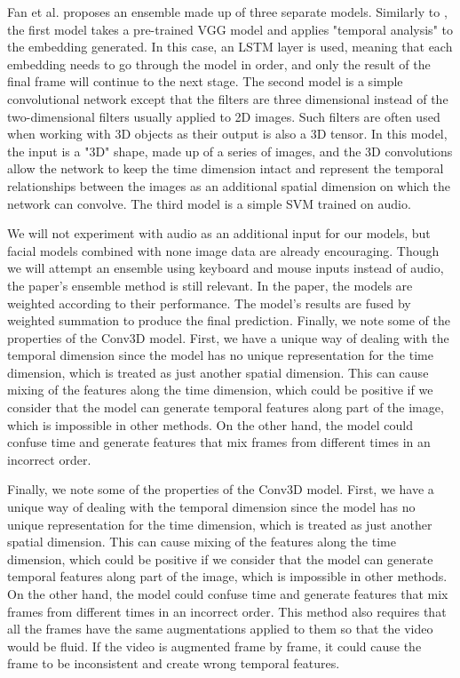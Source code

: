 \documentclass[../main.tex]{subfiles}
\begin{document}
Fan et al. \cite{c3d} proposes an ensemble made up of three separate models. Similarly to \cite{fan},
the first model takes a pre-trained VGG model and applies "temporal analysis" to the embedding generated. In this case,
an LSTM \cite{lstm} layer is used, meaning that each embedding needs to go through the model in order, and only the result of the final frame will
continue to the next stage. The second model is a simple convolutional network except that the filters are three dimensional instead of
the two-dimensional filters usually applied to 2D images. Such filters are often used when working with 3D objects as their output is also a 3D tensor.
In this model, the input is a "3D" shape, made up of a series of images, and the 3D convolutions allow the network to keep the time dimension intact
and represent the temporal relationships between the images as an additional spatial dimension on which the network can convolve. The third model
is a simple SVM trained on audio.
\par

We will not experiment with audio as an additional input for our models, but facial models combined with none image data are already encouraging.
Though we will attempt an ensemble using keyboard and mouse inputs instead of audio, the paper's ensemble method is still relevant. In the paper,
the models are weighted according to their performance. The model's results are fused by weighted summation to produce the final prediction. 
Finally, we note some of the properties of the Conv3D model. First, we have a unique way of dealing with the temporal dimension since
the model has no unique representation for the time dimension, which is treated as just another spatial dimension. This can cause mixing
of the features along the time dimension, which could be positive if we consider that the model can generate temporal features along part of the image,
which is impossible in other methods. On the other hand, the model could confuse time and generate features that mix frames from different
times in an incorrect order.
\par

Finally, we note some of the properties of the Conv3D model. First, we have a unique way of dealing with the temporal dimension since the model
has no unique representation for the time dimension, which is treated as just another spatial dimension.
This can cause mixing of the features along the time dimension, which could be positive if we consider that the model can generate temporal
features along part of the image, which is impossible in other methods. On the other hand, the model could confuse time and generate features
that mix frames from different times in an incorrect order. This method also requires that all the frames have the same augmentations applied
to them so that the video would be fluid. If the video is augmented frame by frame,
it could cause the frame to be inconsistent and create wrong temporal features.
\end{document}
